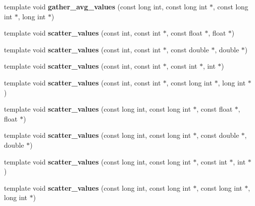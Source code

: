 \begin{DoxyCompactItemize}
\item 
\mbox{\label{namespaceschwz_ab80e27a06c01f85e821b1fd0b20342b5}} 
template void {\bfseries gather\+\_\+avg\+\_\+values} (const long int, const long int $\ast$, const long int $\ast$, long int $\ast$)
\item 
\mbox{\label{namespaceschwz_af2581a54865ba2cf58b58dfd35725798}} 
template void {\bfseries scatter\+\_\+values} (const int, const int $\ast$, const float $\ast$, float $\ast$)
\item 
\mbox{\label{namespaceschwz_a936497bda52c4576c12e53e253cceab2}} 
template void {\bfseries scatter\+\_\+values} (const int, const int $\ast$, const double $\ast$, double $\ast$)
\item 
\mbox{\label{namespaceschwz_a166460cb963d5ee838ced61ad3d382f6}} 
template void {\bfseries scatter\+\_\+values} (const int, const int $\ast$, const int $\ast$, int $\ast$)
\item 
\mbox{\label{namespaceschwz_aa8f9c56f2d0a9aaf5509c3bc86c8155e}} 
template void {\bfseries scatter\+\_\+values} (const int, const int $\ast$, const long int $\ast$, long int $\ast$)
\item 
\mbox{\label{namespaceschwz_a3fec6640931ec9c0e528e90d27d0951d}} 
template void {\bfseries scatter\+\_\+values} (const long int, const long int $\ast$, const float $\ast$, float $\ast$)
\item 
\mbox{\label{namespaceschwz_a30054ec4df2645e3b13bc3df228d1273}} 
template void {\bfseries scatter\+\_\+values} (const long int, const long int $\ast$, const double $\ast$, double $\ast$)
\item 
\mbox{\label{namespaceschwz_a24803b7dd7b84c7c8054e11d6a9194fb}} 
template void {\bfseries scatter\+\_\+values} (const long int, const long int $\ast$, const int $\ast$, int $\ast$)
\item 
\mbox{\label{namespaceschwz_a9136fe3be2935ea9e1baf81e3e190635}} 
template void {\bfseries scatter\+\_\+values} (const long int, const long int $\ast$, const long int $\ast$, long int $\ast$)

\end{DoxyCompactItemize}
